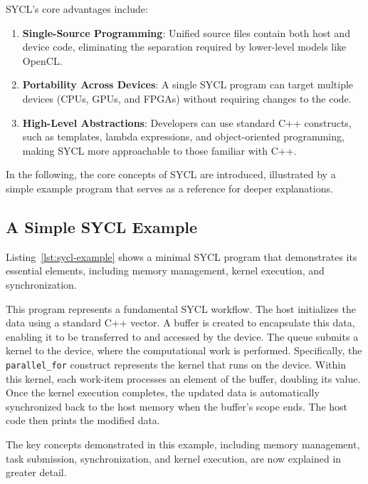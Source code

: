 SYCL’s core advantages include:
\begin{enumerate}
    \item \textbf{Single-Source Programming}: Unified source files contain both host and device code, eliminating the separation
    required by lower-level models like OpenCL.
    \item \textbf{Portability Across Devices}: A single SYCL program can target multiple devices (CPUs, GPUs, and FPGAs) without
    requiring changes to the code.
    \item \textbf{High-Level Abstractions}: Developers can use standard C++ constructs, such as templates, lambda expressions, and
    object-oriented programming, making SYCL more approachable to those familiar with C++.
\end{enumerate}

In the following, the core concepts of SYCL are introduced, illustrated by a simple example program that serves as a reference for
deeper explanations.

\subsection{A Simple SYCL Example}

Listing~\ref{lst:sycl-example} shows a minimal SYCL program that demonstrates its essential elements, including memory management, kernel execution, and
synchronization.

This program represents a fundamental SYCL workflow. The host initializes the data using a standard C++ vector. A buffer is created
to encapsulate this data, enabling it to be transferred to and accessed by the device. The queue submits a kernel to the device,
where the computational work is performed. Specifically, the \texttt{parallel\_for} construct represents the kernel that runs on the
device. Within this kernel, each work-item processes an element of the buffer, doubling its value. Once the kernel execution
completes, the updated data is automatically synchronized back to the host memory when the buffer's scope ends. The host code then
prints the modified data.

The key concepts demonstrated in this example, including memory management, task submission, synchronization, and kernel execution,
are now explained in greater detail.


